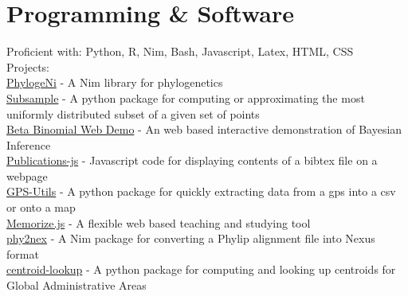 \section*{Programming \& Software}
Proficient with:
Python,
R,
Nim,
Bash,
Javascript,
Latex,
HTML,
CSS
\\

Projects: \\

\href{http://github.com/kerrycobb/phylogeni}{PhylogeNi}
- A Nim library for phylogenetics \\

\href{http://github.com/kerrycobb/subsample}{Subsample}
- A python package for computing or approximating the most uniformly
distributed subset of a given set of points \\

\href{http://github.com/kerrycobb/beta-binomial-web-demo}{Beta Binomial Web Demo}
- An web based interactive demonstration of Bayesian Inference \\

\href{http://github.com/kerrycobb/publications-js}{Publications-js}
- Javascript code for displaying contents of a bibtex file on a webpage \\

\href{http://github.com/kerrycobb/gps-utils}{GPS-Utils}
- A python package for quickly extracting data from a gps into a csv or
onto a map \\

\href{http://www.github.com/kerrycobb/memorize.js}{Memorize.js}
- A flexible web based teaching and studying tool \\

\href{http://github.com/kerrycobb/phy2nex}{phy2nex}
- A Nim package for converting a Phylip alignment file into Nexus format \\

\href{http://github.com/kerrycobb/centroid-lookup}{centroid-lookup}
- A python package for computing and looking up centroids for Global
Administrative Areas \\



